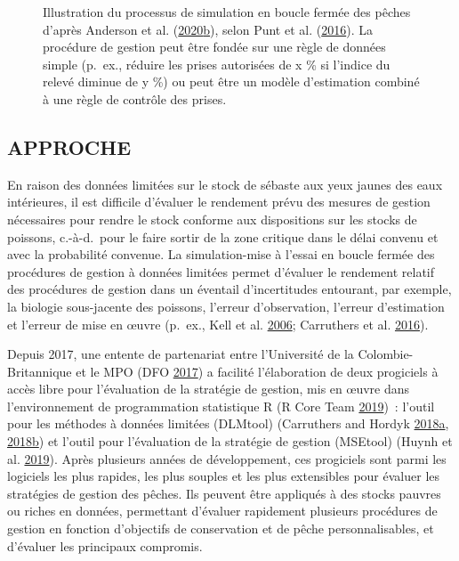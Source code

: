 \documentclass[11pt]{book}
\begin{document}
\begin{figure}[htb]

{\centering {} 

}

\caption{Illustration du processus de simulation en boucle fermée des pêches d'après Anderson et al. (\protect\hyperlink{ref-anderson2020gfmp}{2020}\protect\hyperlink{ref-anderson2020gfmp}{b}), selon Punt et al. (\protect\hyperlink{ref-punt2016}{2016}). La procédure de gestion peut être fondée sur une règle de données simple (p.~ex., réduire les prises autorisées de x \% si l'indice du relevé diminue de y \%) ou peut être un modèle d'estimation combiné à une règle de contrôle des prises.}\label{fig:mse-chart-basic}
\end{figure}
\hypertarget{sec:introduction-approach}{%
\subsection{APPROCHE}\label{sec:introduction-approach}}

En raison des données limitées sur le stock de sébaste aux yeux jaunes des eaux intérieures, il est difficile d'évaluer le rendement prévu des mesures de gestion nécessaires pour rendre le stock conforme aux dispositions sur les stocks de poissons, c.-à-d.~pour le faire sortir de la zone critique dans le délai convenu et avec la probabilité convenue. La simulation-mise à l'essai en boucle fermée des procédures de gestion à données limitées permet d'évaluer le rendement relatif des procédures de gestion dans un éventail d'incertitudes entourant, par exemple, la biologie sous-jacente des poissons, l'erreur d'observation, l'erreur d'estimation et l'erreur de mise en œuvre (p.~ex., Kell et al. \protect\hyperlink{ref-kell2006}{2006}; Carruthers et al. \protect\hyperlink{ref-carruthers2016}{2016}).

Depuis 2017, une entente de partenariat entre l'Université de la Colombie-Britannique et le MPO (DFO \protect\hyperlink{ref-dfo_dlmtool_2017}{2017}) a facilité l'élaboration de deux progiciels à accès libre pour l'évaluation de la stratégie de gestion, mis en œuvre dans l'environnement de programmation statistique R (R Core Team \protect\hyperlink{ref-r2019}{2019})~: l'outil pour les méthodes à données limitées (DLMtool) (Carruthers and Hordyk \protect\hyperlink{ref-carruthers2018}{2018}\protect\hyperlink{ref-carruthers2018}{a}, \protect\hyperlink{ref-carruthers_hordyk_2018}{2018}\protect\hyperlink{ref-carruthers_hordyk_2018}{b}) et l'outil pour l'évaluation de la stratégie de gestion (MSEtool) (Huynh et al. \protect\hyperlink{ref-huynh_msetool_2019}{2019}). Après plusieurs années de développement, ces progiciels sont parmi les logiciels les plus rapides, les plus souples et les plus extensibles pour évaluer les stratégies de gestion des pêches. Ils peuvent être appliqués à des stocks pauvres ou riches en données, permettant d'évaluer rapidement plusieurs procédures de gestion en fonction d'objectifs de conservation et de pêche personnalisables, et d'évaluer les principaux compromis.
\end{document}
